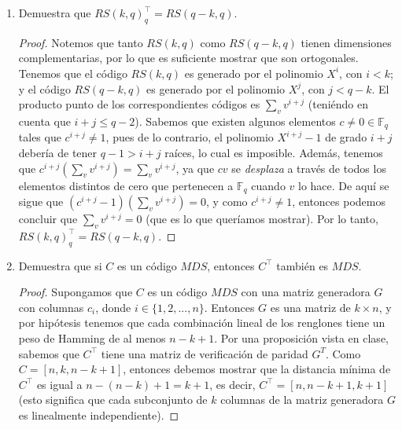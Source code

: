 \documentclass[letterpaper,11pt]{article}
\begin{document}
\begin{enumerate}
\begin{proof}
        \newpage
        bases. Por lo tanto, el número de subespacios de dimensión $k$ de $V$ 
        es 
        \begin{center}
            $\mathcal{G}(n, k) = \frac{(q^{n}-1)(q^{n}-q)\cdots(q^{n}-q^{k-1})}
                                    {(q^{k}-1)(q^{k}-q)\cdots(q^{k}-q^ {k-1})}$
        \end{center}
    \end{proof}

    \item Demuestra que $RS(k, q)^{\top}_{q} = RS(q-k, q)$.
    \begin{proof}
        Notemos que tanto $RS(k,q)$ como $RS(q-k,q)$ tienen dimensiones 
        complementarias, por lo que es suficiente mostrar que son ortogonales.
        Tenemos que el código $RS(k,q)$ es generado por el polinomio $X^{i}$,
        con $i < k$; y el código $RS(q-k, q)$ es generado por el 
        polinomio $X^{j}$, con $j < q-k$. El producto punto de los 
        correspondientes códigos es $\sum_{v} v^{i+j}$ (teniéndo en cuenta que
        $i + j \leq q -2$). Sabemos que existen algunos elementos  
        $c \not = 0 \in \mathbb{F}_{q}$ tales que $c^{i+j} \not = 1$, pues de 
        lo contrario, el polinomio $X^{i+j}-1$ de grado $i+j$ debería de tener
        $q-1 > i+j$ raíces, lo cual es imposible.
        Además, tenemos que $c^{i+j} \left(\sum_{v} v^{i+j} \right) = 
        \sum_{v} v^{i+j}$, ya que $cv$ se \textit{desplaza} a través de todos
        los elementos distintos de cero que pertenecen a $\mathbb{F}_{q}$ 
        cuando $v$ lo hace. De aquí se sigue que $(c^{i+j}-1) \left(\sum_{v} 
        v^{i+j} \right) = 0$, y como $c^{i+j} \not = 1$, entonces podemos
        concluir que $\sum_{v} v^{i+j} = 0$ (que es lo que queríamos mostrar).
        Por lo tanto, $RS(k, q)^{\top}_{q} = RS(q-k, q)$.
         
    \end{proof}
        
    \item Demuestra que si $C$ es un código $MDS$, entonces $C^{\top}$ también
    es $MDS$. 
    \begin{proof}
        Supongamos que $C$ es un código $MDS$ con una matriz generadora $G$ 
        con columnas $c_{i}$, donde $i \in \{1,2, ..., n\}$. Entonces $G$ es
        una matriz de $k \times n$, y por hipótesis tenemos que cada 
        combinación lineal de los renglones tiene un peso de Hamming de al
        menos $n-k+1$. Por una proposición vista en clase, sabemos que 
        $C^{\top}$ tiene una matriz de verificación de paridad $G^{T}$.
        Como $C = [n,k,n-k+1]$, entonces debemos mostrar que la distancia
        mínima de $C^{\top}$ es igual a $n-(n-k)+1= k+1$, es decir, 
        $C^{\top} = [n,n-k+1,k+1]$ (esto significa que cada subconjunto de $k$ 
        columnas de la matriz generadora $G$ es linealmente independiente).
        

\end{proof}
\end{enumerate}
\end{document}
